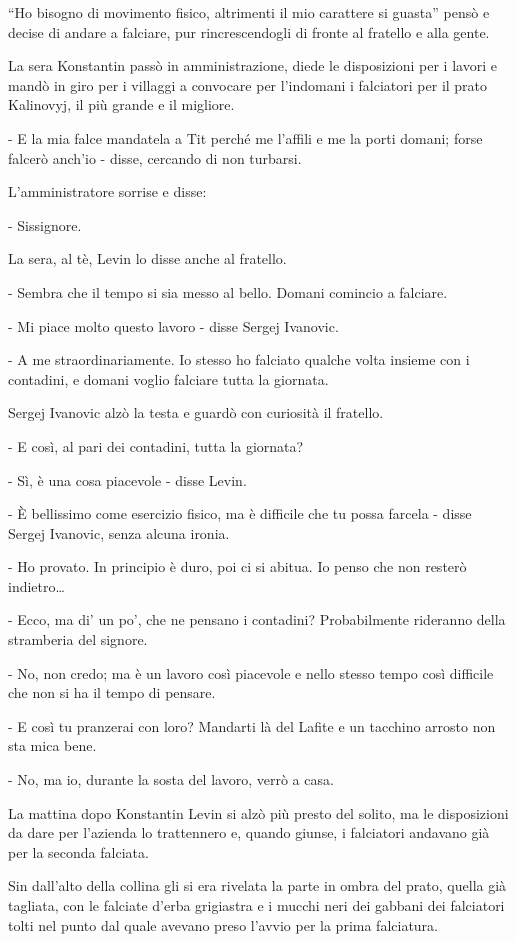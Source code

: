 ``Ho bisogno di movimento fisico, altrimenti il mio carattere si guasta'' pensò e decise di andare a falciare, pur rincrescendogli di fronte al fratello e alla gente. 

La sera Konstantin passò in amministrazione, diede le disposizioni per i lavori e mandò in giro per i villaggi a convocare per l'indomani i falciatori per il prato Kalinovyj, il più grande e il migliore. 

- E la mia falce mandatela a Tit perché me l'affili e me la porti domani; forse falcerò anch'io - disse, cercando di non turbarsi. 

L'amministratore sorrise e disse: 

- Sissignore. 

La sera, al tè, Levin lo disse anche al fratello. 

- Sembra che il tempo si sia messo al bello. Domani comincio a falciare. 

- Mi piace molto questo lavoro - disse Sergej Ivanovic. 

- A me straordinariamente. Io stesso ho falciato qualche volta insieme con i contadini, e domani voglio falciare tutta la giornata. 

Sergej Ivanovic alzò la testa e guardò con curiosità il fratello. 

- E così, al pari dei contadini, tutta la giornata? 

- Sì, è una cosa piacevole - disse Levin. 

- È bellissimo come esercizio fisico, ma è difficile che tu possa farcela - disse Sergej Ivanovic, senza alcuna ironia. 

- Ho provato. In principio è duro, poi ci si abitua. Io penso che non resterò indietro\ldots{} 

- Ecco, ma di' un po', che ne pensano i contadini? Probabilmente rideranno della stramberia del signore. 

- No, non credo; ma è un lavoro così piacevole e nello stesso tempo così difficile che non si ha il tempo di pensare. 

- E così tu pranzerai con loro? Mandarti là del Lafite e un tacchino arrosto non sta mica bene. 

- No, ma io, durante la sosta del lavoro, verrò a casa. 

La mattina dopo Konstantin Levin si alzò più presto del solito, ma le disposizioni da dare per l'azienda lo trattennero e, quando giunse, i falciatori andavano già per la seconda falciata. 

Sin dall'alto della collina gli si era rivelata la parte in ombra del prato, quella già tagliata, con le falciate d'erba grigiastra e i mucchi neri dei gabbani dei falciatori tolti nel punto dal quale avevano preso l'avvio per la prima falciatura. 

